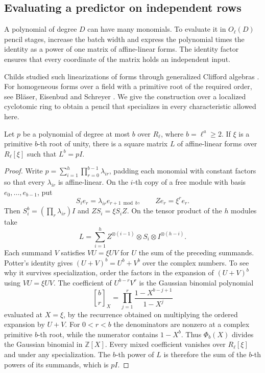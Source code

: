 \subsection{Evaluating a predictor on independent rows}

A polynomial of degree \(D\) can have many monomials. To evaluate it in
\(O_\ell(D)\) pencil stages, increase the batch width and express the
polynomial times the identity as a power of one matrix of affine-linear
forms. The identity factor ensures that every coordinate of the matrix
holds an independent input.

Childs studied such linearizations of forms through generalized Clifford
algebras \cite{childs}. For homogeneous forms over a field with a
primitive root of the required order, see Bl\"aser, Eisenbud and
Schreyer \cite[Theorem~2.1]{ulrichcomplexity}. We give the construction
over a localized cyclotomic ring to obtain a pencil that specializes in
every characteristic allowed here.

\begin{lemma}\label{lem:matrix-root}
Let \(p\) be a polynomial of degree at most \(b\) over \(R_\ell\), where
\(b=\ell^a\ge2\). If \(\xi\) is a primitive \(b\)-th root of unity,
there is a square matrix \(L\) of affine-linear forms over
\(R_\ell[\xi]\) such that \(L^b=pI\).
\end{lemma}
\begin{proof}
Write \(p=\sum_{i=1}^h\prod_{r=0}^{b-1}\lambda_{ir}\), padding each
monomial with constant factors so that every \(\lambda_{ir}\) is
affine-linear. On the \(i\)-th copy of a free module with basis
\(e_0,\ldots,e_{b-1}\), put
\[
 S_i e_r=\lambda_{ir} e_{r+1\bmod b},\qquad Z e_r=\xi^r e_r .
\]
Then \(S_i^b=(\prod_r\lambda_{ir})I\) and \(ZS_i=\xi S_i Z\).
On the tensor product of the \(h\) modules take
\[
 L=\sum_{i=1}^h Z^{\otimes(i-1)}\otimes S_i\otimes I^{\otimes(h-i)} .
\]
Each summand \(V\) satisfies \(VU=\xi UV\) for \(U\) the sum of the
preceding summands. Potter's identity \cite{potter} gives
\((U+V)^b=U^b+V^b\) over the complex numbers. To see why it survives
specialization, order the factors in the expansion of \((U+V)^b\)
using \(VU=\xi UV\). The coefficient of \(U^{b-r}V^r\) is the
Gaussian binomial polynomial
\[
 \genfrac{[}{]}{0pt}{}{b}{r}_{\!X}
     =\prod_{j=1}^r\frac{1-X^{b-j+1}}{1-X^j}
\]
evaluated at \(X=\xi\), by the recurrence obtained on multiplying the
ordered expansion by \(U+V\). For \(0<r<b\) the denominators are
nonzero at a complex primitive \(b\)-th root, while the numerator
contains \(1-X^b\). Thus \(\Phi_b(X)\) divides the Gaussian binomial
in \(\mathbb Z[X]\). Every mixed coefficient vanishes over \(R_\ell[\xi]\)
and under any specialization. The \(b\)-th power of \(L\) is therefore
the sum of the \(b\)-th powers of its summands, which is \(pI\).
\end{proof}

